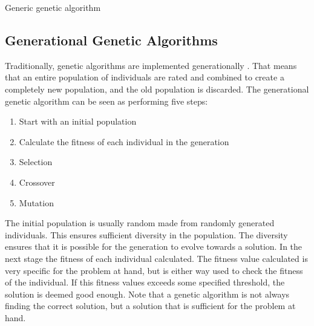 \begin{algorithm}[H]
\SetAlgoLined
\DontPrintSemicolon
{}
\caption{Generic genetic algorithm}
\label{algorithm:pseudo-code-for-ga}
\end{algorithm}


\subsection{Generational Genetic Algorithms}

Traditionally, genetic algorithms are implemented generationally . That means that an entire population of individuals are rated and combined to create a completely new population, and the old population is discarded. The generational genetic algorithm can be seen as performing five steps:


\begin{enumerate}
    \item Start with an initial population
    \item Calculate the fitness of each individual in the generation
    \item Selection
    \item Crossover
    \item Mutation  
\end{enumerate}

The initial population is usually random made from randomly generated individuals. This ensures sufficient diversity in the population. The diversity ensures that it is possible for the generation to evolve towards a solution. In the next stage the fitness of each individual calculated. The fitness value calculated is very specific for the problem at hand, but is either way used to check the fitness of the individual. If this fitness values exceeds some specified threshold, the solution is deemed good enough. Note that a genetic algorithm is not always finding the correct solution, but a solution that is sufficient for the problem at hand.

